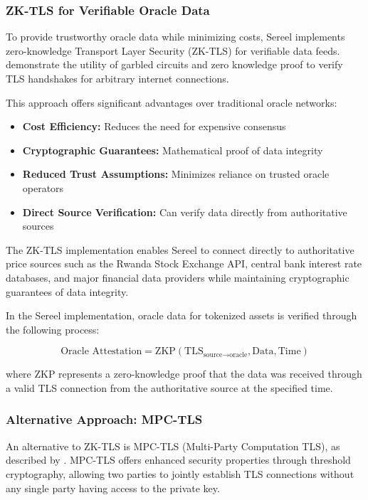 \documentclass[12pt]{article}
\begin{document}
\subsubsection{ZK-TLS for Verifiable Oracle Data}
To provide trustworthy oracle data while minimizing costs, Sereel implements zero-knowledge Transport Layer Security (ZK-TLS) for verifiable data feeds. \citet{xie2023zktls} demonstrate the utility of garbled circuits and zero knowledge proof to verify TLS handshakes for arbitrary internet connections.

This approach offers significant advantages over traditional oracle networks:

\begin{itemize}
  \item \textbf{Cost Efficiency:} Reduces the need for expensive consensus
  \item \textbf{Cryptographic Guarantees:} Mathematical proof of data integrity
  \item \textbf{Reduced Trust Assumptions:} Minimizes reliance on trusted oracle operators
  \item \textbf{Direct Source Verification:} Can verify data directly from authoritative sources
\end{itemize}

The ZK-TLS implementation enables Sereel to connect directly to authoritative price sources such as the Rwanda Stock Exchange API, central bank interest rate databases, and major financial data providers while maintaining cryptographic guarantees of data integrity.

In the Sereel implementation, oracle data for tokenized assets is verified through the following process:

\begin{equation}
\text{Oracle Attestation} = \text{ZKP}(\text{TLS}_{\text{source} \rightarrow \text{oracle}}, \text{Data}, \text{Time})
\end{equation}

where ZKP represents a zero-knowledge proof that the data was received through a valid TLS connection from the authoritative source at the specified time.

\subsubsection{Alternative Approach: MPC-TLS}

An alternative to ZK-TLS is MPC-TLS (Multi-Party Computation TLS), as described by \citet{dagas2024mpctls}. MPC-TLS offers enhanced security properties through threshold cryptography, allowing two parties to jointly establish TLS connections without any single party having access to the private key.
\end{document}
